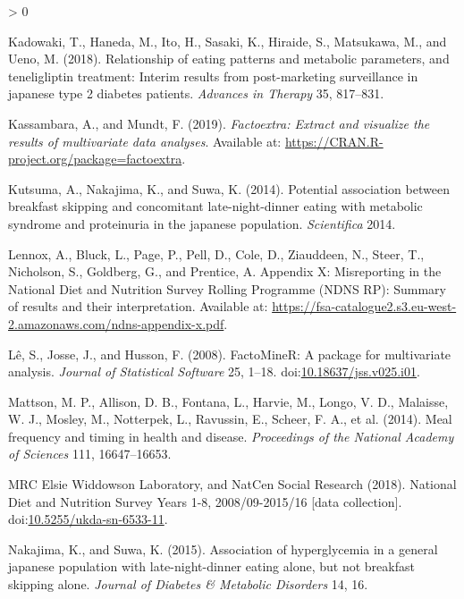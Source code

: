 \documentclass[utf8]{frontiersSCNS}
\newlength{\cslhangindent}
\newenvironment{CSLReferences}[2] %
 {%
  \setlength{\parindent}{0pt}
  \ifodd #1 \everypar{\setlength{\hangindent}{\cslhangindent}}\ignorespaces\fi
  \ifnum #2 > 0
  \setlength{\parskip}{#2\baselineskip}
  \fi
 }%
 {}
\begin{document}
\begin{CSLReferences}{1}{0}
\leavevmode\hypertarget{ref-kadowaki2018relationship}{}%
Kadowaki, T., Haneda, M., Ito, H., Sasaki, K., Hiraide, S., Matsukawa,
M., and Ueno, M. (2018). Relationship of eating patterns and metabolic
parameters, and teneligliptin treatment: Interim results from
post-marketing surveillance in japanese type 2 diabetes patients.
\emph{Advances in Therapy} 35, 817--831.

\leavevmode\hypertarget{ref-factoextra}{}%
Kassambara, A., and Mundt, F. (2019). \emph{Factoextra: Extract and
visualize the results of multivariate data analyses}. Available at:
\url{https://CRAN.R-project.org/package=factoextra}.

\leavevmode\hypertarget{ref-kutsuma2014potential}{}%
Kutsuma, A., Nakajima, K., and Suwa, K. (2014). Potential association
between breakfast skipping and concomitant late-night-dinner eating with
metabolic syndrome and proteinuria in the japanese population.
\emph{Scientifica} 2014.

\leavevmode\hypertarget{ref-Lennoxappx}{}%
Lennox, A., Bluck, L., Page, P., Pell, D., Cole, D., Ziauddeen, N.,
Steer, T., Nicholson, S., Goldberg, G., and Prentice, A. Appendix {X}:
{M}isreporting in the {N}ational {D}iet and {N}utrition {S}urvey
{R}olling {P}rogramme ({NDNS RP}): Summary of results and their
interpretation. Available at:
\url{https://fsa-catalogue2.s3.eu-west-2.amazonaws.com/ndns-appendix-x.pdf}.

\leavevmode\hypertarget{ref-L__2008}{}%
Lê, S., Josse, J., and Husson, F. (2008). {FactoMineR}: A package for
multivariate analysis. \emph{Journal of Statistical Software} 25, 1--18.
doi:\href{https://doi.org/10.18637/jss.v025.i01}{10.18637/jss.v025.i01}.

\leavevmode\hypertarget{ref-mattson2014meal}{}%
Mattson, M. P., Allison, D. B., Fontana, L., Harvie, M., Longo, V. D.,
Malaisse, W. J., Mosley, M., Notterpek, L., Ravussin, E., Scheer, F. A.,
et al. (2014). Meal frequency and timing in health and disease.
\emph{Proceedings of the National Academy of Sciences} 111,
16647--16653.

\leavevmode\hypertarget{ref-MRCElsieWiddowsonLaboratory2018}{}%
MRC Elsie Widdowson Laboratory, and NatCen Social Research (2018).
National {D}iet and {N}utrition {S}urvey {Y}ears 1-8, 2008/09-2015/16
{[}data collection{]}.
doi:\href{https://doi.org/10.5255/ukda-sn-6533-11}{10.5255/ukda-sn-6533-11}.

\leavevmode\hypertarget{ref-nakajima2015association}{}%
Nakajima, K., and Suwa, K. (2015). Association of hyperglycemia in a
general japanese population with late-night-dinner eating alone, but not
breakfast skipping alone. \emph{Journal of Diabetes \& Metabolic
Disorders} 14, 16.


\end{CSLReferences}
\end{document}
